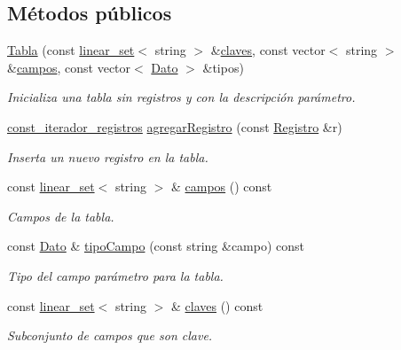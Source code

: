 \subsection*{Métodos públicos}
\begin{DoxyCompactItemize}
\item 
\mbox{\hyperlink{classTabla_a5a7be353082561e06a877b2255c0ea5c}{Tabla}} (const \mbox{\hyperlink{classlinear__set}{linear\+\_\+set}}$<$ string $>$ \&\mbox{\hyperlink{classTabla_a9b75ecc34187bd3aaec51f610c961d33}{claves}}, const vector$<$ string $>$ \&\mbox{\hyperlink{classTabla_a9c9db2609fca7a928c12f423864dbe8d}{campos}}, const vector$<$ \mbox{\hyperlink{classDato}{Dato}} $>$ \&tipos)
\begin{DoxyCompactList}\small\item\em Inicializa una tabla sin registros y con la descripción parámetro. \end{DoxyCompactList}\item 
\mbox{\hyperlink{classTabla_1_1const__iterador__registros}{const\+\_\+iterador\+\_\+registros}} \mbox{\hyperlink{classTabla_a99345e41702e7e9984732c6f3672e386}{agregar\+Registro}} (const \mbox{\hyperlink{classRegistro}{Registro}} \&r)
\begin{DoxyCompactList}\small\item\em Inserta un nuevo registro en la tabla. \end{DoxyCompactList}\item 
const \mbox{\hyperlink{classlinear__set}{linear\+\_\+set}}$<$ string $>$ \& \mbox{\hyperlink{classTabla_a9c9db2609fca7a928c12f423864dbe8d}{campos}} () const
\begin{DoxyCompactList}\small\item\em Campos de la tabla. \end{DoxyCompactList}\item 
const \mbox{\hyperlink{classDato}{Dato}} \& \mbox{\hyperlink{classTabla_ad73268a20c41a93f2ffd34656e1f0123}{tipo\+Campo}} (const string \&campo) const
\begin{DoxyCompactList}\small\item\em Tipo del campo parámetro para la tabla. \end{DoxyCompactList}\item 
const \mbox{\hyperlink{classlinear__set}{linear\+\_\+set}}$<$ string $>$ \& \mbox{\hyperlink{classTabla_a9b75ecc34187bd3aaec51f610c961d33}{claves}} () const
\begin{DoxyCompactList}\small\item\em Subconjunto de campos que son clave. \end{DoxyCompactList}\item 

\end{DoxyCompactItemize}
